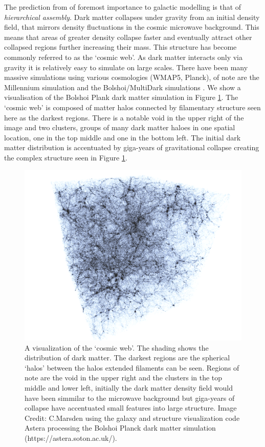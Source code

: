 The prediction from \LCDM of foremost importance to galactic modelling is that of \textit{hierarchical assembly}. Dark matter collapses under gravity from an initial density field, that mirrors density fluctuations in the cosmic microwave background. This means that areas of greater density collapse faster and eventually attract other collapsed regions further increasing their mass. This structure has become commonly referred to as the `cosmic web'. As dark matter interacts only via gravity it is relatively easy to simulate on large scales. There have been many massive \LCDM simulations using various cosmologies (WMAP5, Planck), of note are the Millennium simulation \citep{Boylan-Kolchin2009ResolvingSimulation} and the Bolshoi/MultiDark simulations \citep{Klypin2016}. We show a visualisation of the Bolshoi Plank dark matter simulation in Figure \ref{fig:DMStruct}. The `cosmic web' is composed of matter halos connected by filamentary structure seen here as the darkest regions. There is a notable void in the upper right of the image and two clusters, groups of many dark matter haloes in one spatial location, one in the top middle and one in the bottom left. The initial dark matter distribution is accentuated by giga-years of gravitational collapse creating the complex structure seen in Figure \ref{fig:DMStruct}.

\begin{figure}[ht]
	\centering
	\includegraphics[width = \linewidth]{Figures/Chapter1/DMStruct.png}
    \caption{A visualization of the `cosmic web'. The shading shows the distribution of dark matter. The darkest regions are the spherical `halos' between the halos extended filaments can be seen. Regions of note are the void in the upper right and the clusters in the top middle and lower left, initially the dark matter density field would have been simmilar to the microwave background but giga-years of collapse have accentuated small features into large structure. Image Credit: C.Marsden using the galaxy and structure visualization code Astera processing the Bolshoi Planck dark matter simulation (https://astera.soton.ac.uk/).}
	\label{fig:DMStruct}
\end{figure}

